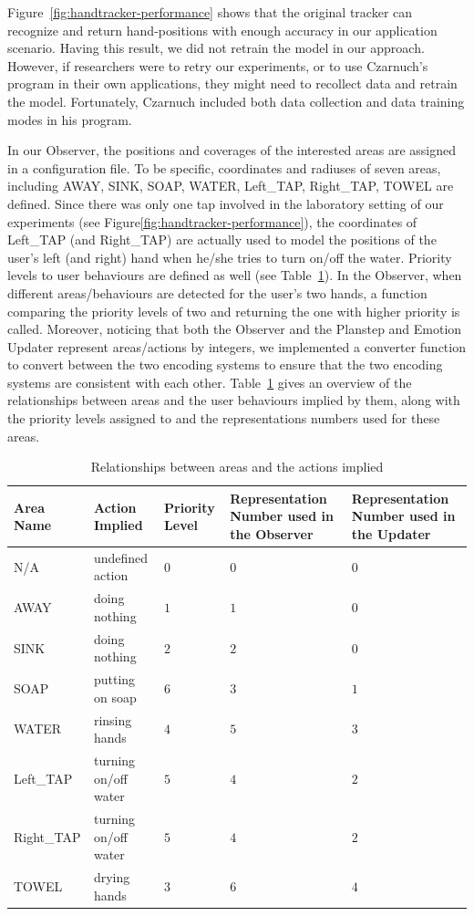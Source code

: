 Figure~\ref{fig:handtracker-performance} shows that the original tracker can recognize and return hand-positions with enough accuracy in our application scenario. Having this result, we did not retrain the model in our approach. However, if researchers were to retry our experiments, or to use Czarnuch's program in their own applications, they might need to recollect data and retrain the model. Fortunately, Czarnuch included both data collection and data training modes in his program.

In our Observer, the positions and coverages of the interested areas are assigned in a configuration file. To be specific, coordinates and radiuses of seven areas, including AWAY, SINK, SOAP, WATER, Left\_TAP, Right\_TAP, TOWEL are defined. Since there was only one tap involved in the laboratory setting of our experiments (see Figure\ref{fig:handtracker-performance}), the coordinates of Left\_TAP (and Right\_TAP) are actually used to model the positions of the user's left (and right) hand when he/she tries to turn on/off the water. Priority levels to user behaviours are defined as well (see Table~\ref{table:area-action}). In the Observer, when different areas/behaviours are detected for the user's two hands, a function comparing the priority levels of two and returning the one with higher priority is called. Moreover, noticing that both the Observer and the Planstep and Emotion Updater represent areas/actions by integers, we implemented a converter function to convert between the two encoding systems to ensure that the two encoding systems are consistent with each other. Table~\ref{table:area-action} gives an overview of the relationships between areas and the user behaviours implied by them, along with the priority levels assigned to and the representations numbers used for these areas.

%
\begin{table}
\centering
\caption{Relationships between areas and the actions implied}
\label{table:area-action}
\begin{tabular}{| l | l | p{2cm} | p{3cm} | p{3cm} |}
\hline
Area Name & Action Implied & Priority Level & 
Representation Number used in the Observer  & Representation Number used in the Updater \\ \hline
N/A & undefined action & $0$ & $0$ & $0$ \\ \hline
AWAY & doing nothing & $1$ & $1$ & $0$ \\ \hline
SINK & doing nothing & $2$ & $2$ & $0$ \\ \hline
SOAP & putting on soap & $6$ & $3$ & $1$ \\ \hline
WATER & rinsing hands & $4$ & $5$ & $3$ \\ \hline
Left\_TAP & turning on/off water & $5$ & $4$ & $2$ \\ \hline
Right\_TAP & turning on/off water & $5$ & $4$ & $2$ \\ \hline
TOWEL & drying hands & $3$ & $6$ & $4$ \\ \hline
\end{tabular}
\end{table}

